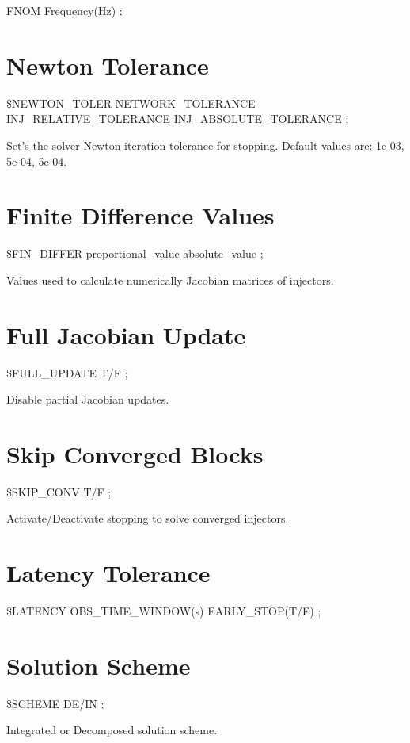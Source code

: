  FNOM Frequency(Hz) ; 


\section{Newton Tolerance}

 \$NEWTON\_TOLER NETWORK\_TOLERANCE INJ\_RELATIVE\_TOLERANCE
	INJ\_ABSOLUTE\_TOLERANCE ; 

Set's the solver Newton iteration tolerance for stopping. Default
values are: 1e-03, 5e-04, 5e-04.


\section{Finite Difference Values}

 \$FIN\_DIFFER proportional\_value absolute\_value
	; 

Values used to calculate numerically Jacobian matrices of injectors.


\section{Full Jacobian Update}

 \$FULL\_UPDATE T/F ; 

Disable partial Jacobian updates.


\section{Skip Converged Blocks}

\$SKIP\_CONV T/F ; 

Activate/Deactivate stopping to solve converged injectors.


\section{Latency Tolerance}

 \$LATENCY OBS\_TIME\_WINDOW(s) EARLY\_STOP(T/F)
	; 


\section{Solution Scheme}

 \$SCHEME DE/IN ; 

Integrated or Decomposed solution scheme.


